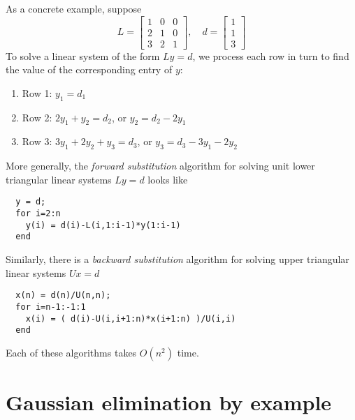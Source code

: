 \documentclass[12pt, leqno]{article}
\begin{document}
As a concrete example, suppose
\[
  L = \begin{bmatrix}
        1 & 0 & 0 \\
        2 & 1 & 0 \\
        3 & 2 & 1
      \end{bmatrix}, \quad
  d = \begin{bmatrix} 1 \\ 1 \\ 3 \end{bmatrix}
\]
To solve a linear system of the form $Ly = d$, we process each row in
turn to find the value of the corresponding entry of $y$:
\begin{enumerate}
\item Row 1:
  $y_1 = d_1$
\item Row 2: $2y_1 + y_2 = d_2$, or $y_2 = d_2 - 2y_1$
\item Row 3: $3y_1 + 2 y_2 + y_3 = d_3$, or $y_3 = d_3 - 3y_1 - 2y_2$
\end{enumerate}
More generally, the {\em forward substitution} algorithm for solving
unit lower triangular linear systems $Ly = d$ looks like
\begin{lstlisting}
  y = d;
  for i=2:n
    y(i) = d(i)-L(i,1:i-1)*y(1:i-1)
  end
\end{lstlisting}
Similarly, there is a {\em backward substitution} algorithm for
solving upper triangular linear systems $Ux = d$
\begin{lstlisting}
  x(n) = d(n)/U(n,n);
  for i=n-1:-1:1
    x(i) = ( d(i)-U(i,i+1:n)*x(i+1:n) )/U(i,i)
  end
\end{lstlisting}
Each of these algorithms takes $O(n^2)$ time.

\section{Gaussian elimination by example}
\end{document}
